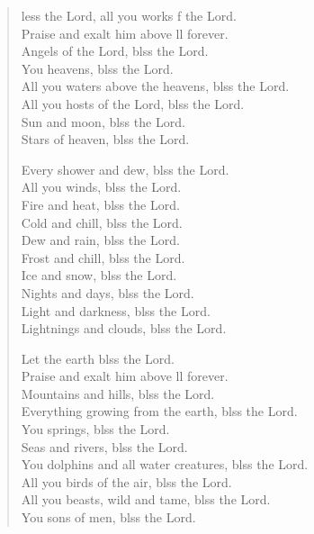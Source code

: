 \begin{verse}
  \begin{patverse}
    less the Lord, all you works f the Lord.\Med\\
Praise and exalt him above ll forever.\\
Angels of the Lord, blss the Lord.\Med\\
You heavens, blss the Lord.\\
All you waters above the heavens, blss the Lord.\Med\\
All you hosts of the Lord, blss the Lord.\\
Sun and moon, blss the Lord.\Med\\
Stars of heaven, blss the Lord.

Every shower and dew, blss the Lord.\Med\\
All you winds, blss the Lord.\\
Fire and heat, blss the Lord.\Med\\
Cold and chill, blss the Lord.\\
Dew and rain, blss the Lord.\Med\\
Frost and chill, blss the Lord.\\
Ice and snow, blss the Lord.\Med\\
Nights and days, blss the Lord.\\
Light and darkness, blss the Lord.\Med\\
Lightnings and clouds, blss the Lord.

Let the earth blss the Lord.\Med\\
Praise and exalt him above ll forever.\\
Mountains and hills, blss the Lord.\Med\\
Everything growing from the earth, blss the Lord.\\
You springs, blss the Lord.\Med\\
Seas and rivers, blss the Lord.\\
You dolphins and all water creatures, blss the Lord.\Med\\
All you birds of the air, blss the Lord.\\
All you beasts, wild and tame, blss the Lord.\Med\\
You sons of men, blss the Lord.


\end{patverse}
\end{verse}
